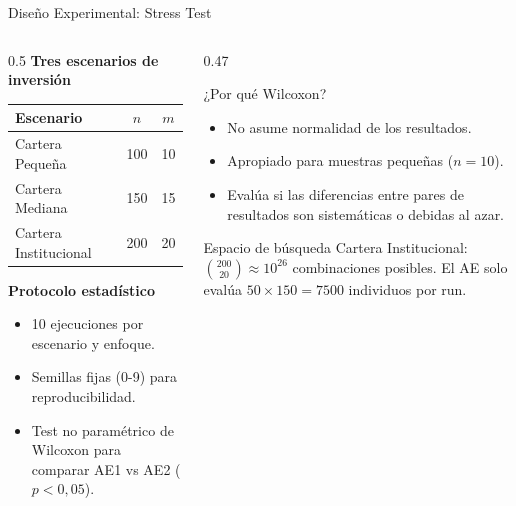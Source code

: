 \documentclass[aspectratio=169]{beamer}
\begin{document}
\begin{frame}{Diseño Experimental: Stress Test}
  \begin{columns}[T]
    \begin{column}{0.5\textwidth}
      \textbf{Tres escenarios de inversión}\\[6pt]
      \begin{tabular}{lcc}
        \toprule
        Escenario & $n$ & $m$ \\
        \midrule
        Cartera Pequeña      & 100 & 10 \\
        Cartera Mediana      & 150 & 15 \\
        Cartera Institucional & 200 & 20 \\
        \bottomrule
      \end{tabular}

      \vspace{10pt}
      \textbf{Protocolo estadístico}
      \begin{itemize}
        \item 10 ejecuciones por escenario y enfoque.
        \item Semillas fijas (0-9) para reproducibilidad.
        \item Test no paramétrico de Wilcoxon para comparar
              AE1 vs AE2 ($p < 0{,}05$).
      \end{itemize}
    \end{column}
    \begin{column}{0.47\textwidth}
      \begin{block}{¿Por qué Wilcoxon?}
        \begin{itemize}
          \item No asume normalidad de los resultados.
          \item Apropiado para muestras pequeñas ($n=10$).
          \item Evalúa si las diferencias entre pares de
                resultados son sistemáticas o debidas al azar.
        \end{itemize}
      \end{block}

      \vspace{8pt}
      \begin{alertblock}{Espacio de búsqueda}
        Cartera Institucional: $\binom{200}{20} \approx 10^{26}$
        combinaciones posibles.
        El AE solo evalúa $50 \times 150 = 7500$ individuos
        por run.
      \end{alertblock}
    \end{column}
  \end{columns}
\end{frame}
\end{document}
